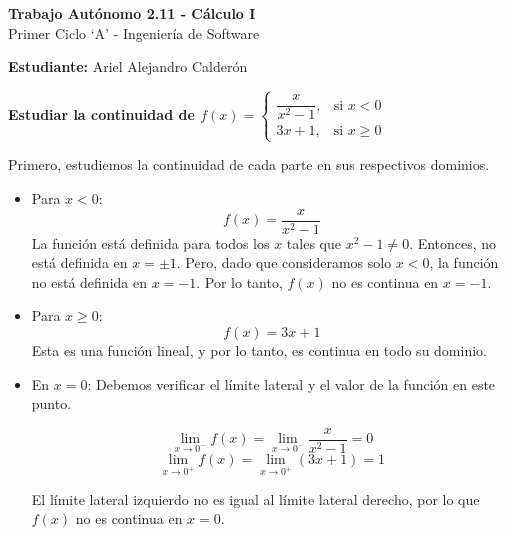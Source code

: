 \documentclass[answers]{exam} %
\begin{document}
\begin{center}
    \large\textbf{Trabajo Autónomo 2.11 - Cálculo I}\\[1em]
    \large Primer Ciclo \enquote*{A} - Ingeniería de Software\\[1em]
\end{center}

\vspace{0.5cm}
\large\textbf{Estudiante:} Ariel Alejandro Calderón
\vspace{0.5cm}

\begin{questions}

    \question \large\textbf{Estudiar la continuidad de \(f(x) =
    \begin{cases}
        \dfrac{x}{x^2 -1}, & \text{si } x < 0 \\
        3x + 1, & \text{si } x \ge 0
    \end{cases}\)}
    \begin{solution}

        Primero, estudiemos la continuidad de cada parte en sus respectivos dominios.

        \begin{itemize}
            \item Para \( x < 0 \):
                \[
                f(x) = \frac{x}{x^2 - 1}
                \]
                La función está definida para todos los \( x \) tales que \( x^2 - 1 \neq 0 \). Entonces, no está definida en \( x = \pm 1 \). Pero, dado que consideramos solo \( x < 0 \), la función no está definida en \( x = -1 \). Por lo tanto, \( f(x) \) no es continua en \( x = -1 \).

            \item Para \( x \ge 0 \):
                \[
                f(x) = 3x + 1
                \]
                Esta es una función lineal, y por lo tanto, es continua en todo su dominio.

            \item En \( x = 0 \):
                Debemos verificar el límite lateral y el valor de la función en este punto.

                \[
                \lim_{x \to 0^-} f(x) = \lim_{x \to 0^-} \frac{x}{x^2 - 1} = 0
                \]
                \[
                \lim_{x \to 0^+} f(x) = \lim_{x \to 0^+} (3x + 1) = 1
                \]

                El límite lateral izquierdo no es igual al límite lateral derecho, por lo que \( f(x) \) no es continua en \( x = 0 \).
        \end{itemize}


\end{solution}
\end{questions}
\end{document}

